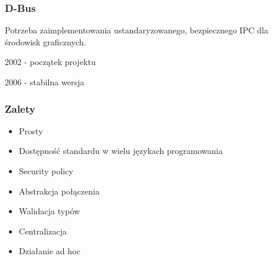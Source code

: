\begin{frame}
    \frametitle{D-Bus}
    Potrzeba zaimplementowania ustandaryzowanego,
    bezpiecznego IPC dla
    środowisk graficznych.

    2002 - początek projektu

    2006 - stabilna wersja
\end{frame}

\begin{frame}
    \frametitle{Zalety}
    \begin{itemize}
        \item Prosty 
        \item Dostępność standardu w wielu językach programowania 
        \item Security policy 
        \item Abstrakcja połączenia 
        \item Walidacja typów
        \item Centralizacja
        \item Działanie ad hoc
    \end{itemize}
\end{frame}